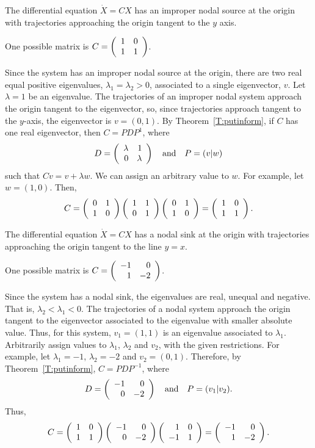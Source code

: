 \documentclass{ximera}
\begin{document}
\begin{exercise} \label{c6.8.2c}
The differential equation $\dot{X}=CX$ has an improper nodal source at the
origin with trajectories approaching the origin tangent to the $y$ axis.

\begin{solution}

\ans One possible matrix is $C = \left(\begin{array}{rr} 1 & 0\\ 1 &1\end{array}\right)$.

\soln Since the system has an improper nodal source at the origin, there
are two real equal positive eigenvalues, $\lambda_1 = \lambda_2 > 0$,
associated to a single eigenvector, $v$.  Let $\lambda = 1$ be an
eigenvalue.  The trajectories of an improper nodal system approach the
origin tangent to the eigenvector, so, since trajectories approach
tangent to the $y$-axis, the eigenvector is $v = (0,1)$.  By
Theorem~\ref{T:putinform}, if $C$ has one
real eigenvector, then $C = PDP^1$, where
\[ D = \left(\begin{array}{rr} \lambda & 1\\ 0 &\lambda\end{array}\right) \quad\mbox{and}\quad P = (v|w) \]
such that $Cv = v + \lambda w$.  We can assign an arbitrary value to
$w$.  For example, let $w = (1,0)$.  Then,
\[ C = \left(\begin{array}{rr} 0 & 1\\ 1 &0\end{array}\right)\left(\begin{array}{rr} 1 & 1\\ 0 &1\end{array}\right)\left(\begin{array}{rr} 0 & 1\\ 1 &0\end{array}\right) =
\left(\begin{array}{rr} 1 & 0\\ 1 &1\end{array}\right). \]

\end{solution}
\end{exercise}
\begin{exercise} \label{c6.8.2d}
The differential equation $\dot{X}=CX$ has a nodal sink at the origin with
trajectories approaching the origin tangent to the line $y=x$.

\begin{solution}

\ans One possible matrix is $C = \left(\begin{array}{rr} -1 & 0\\ 1 &-2\end{array}\right)$.

\soln Since the system has a nodal sink, the eigenvalues are real, unequal
and negative.  That is, $\lambda_2 < \lambda_1 < 0$.  The trajectories
of a nodal system approach the origin tangent to the eigenvector
associated to the eigenvalue with smaller absolute value.  Thus, for
this system, $v_1 = (1,1)$ is an eigenvalue associated to $\lambda_1$.
Arbitrarily assign values to $\lambda_1$, $\lambda_2$ and $v_2$, with
the given restrictions.  For example, let $\lambda_1 = -1$, $\lambda_2
= -2$ and $v_2 = (0,1)$.  Therefore, by
Theorem~\ref{T:putinform}, $C = PDP^{-1}$, where
\[ D = \left(\begin{array}{rr} -1 & 0\\ 0 &-2\end{array}\right) \quad\mbox{and}\quad P = (v_1|v_2). \]
Thus,
\[ C = \left(\begin{array}{rr} 1 & 0\\ 1 &1\end{array}\right)\left(\begin{array}{rr} -1 & 0\\ 0 &-2\end{array}\right)\left(\begin{array}{rr} 1 & 0\\ -1 &1\end{array}\right) =
\left(\begin{array}{rr} -1 & 0\\ 1 &-2\end{array}\right). \]

\end{solution}
\end{exercise}
\end{document}
